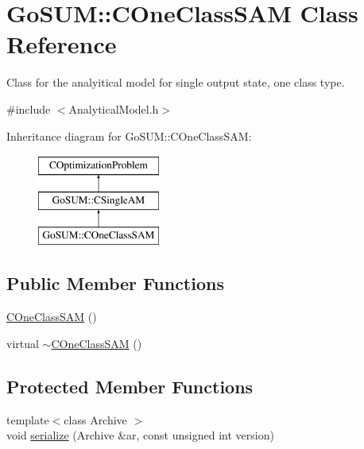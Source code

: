 \hypertarget{class_go_s_u_m_1_1_c_one_class_s_a_m}{\section{Go\-S\-U\-M\-:\-:C\-One\-Class\-S\-A\-M Class Reference}
\label{class_go_s_u_m_1_1_c_one_class_s_a_m}
}


Class for the analyitical model for single output state, one class type.  




{\ttfamily \#include $<$Analytical\-Model.\-h$>$}

Inheritance diagram for Go\-S\-U\-M\-:\-:C\-One\-Class\-S\-A\-M\-:\begin{figure}[H]
\begin{center}
\leavevmode
\includegraphics[height=3.000000cm]{class_go_s_u_m_1_1_c_one_class_s_a_m}
\end{center}
\end{figure}
\subsection*{Public Member Functions}
\begin{DoxyCompactItemize}
\item 
\hyperlink{class_go_s_u_m_1_1_c_one_class_s_a_m_a050f13fc2eb9e6f809bf1ed0183336ca}{C\-One\-Class\-S\-A\-M} ()
\item 
virtual \hyperlink{class_go_s_u_m_1_1_c_one_class_s_a_m_a5af7b14ea2a8cbbf347df65d4a583b5a}{$\sim$\-C\-One\-Class\-S\-A\-M} ()
\end{DoxyCompactItemize}
\subsection*{Protected Member Functions}
\begin{DoxyCompactItemize}
\item 
{\footnotesize template$<$class Archive $>$ }\\void \hyperlink{class_go_s_u_m_1_1_c_one_class_s_a_m_a68ab0232a5c0b2d978b356d05ad4b933}{serialize} (Archive \&ar, const unsigned int version)
\end{DoxyCompactItemize}
